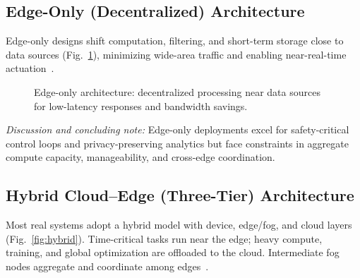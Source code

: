 \documentclass[conference]{IEEEtran}
\begin{document}
\subsection{Edge-Only (Decentralized) Architecture}
Edge-only designs shift computation, filtering, and short-term storage close to data sources (Fig.~\ref{fig:edgeonly}), minimizing wide-area traffic and enabling near-real-time actuation~\cite{Shi2016IoTJ,Satya2017Emergence}.

\begin{figure}[t]
  \centering
  \caption{Edge-only architecture: decentralized processing near data sources for low-latency responses and bandwidth savings.}
  \label{fig:edgeonly}
\end{figure}

\textit{Discussion and concluding note:} Edge-only deployments excel for safety-critical control loops and privacy-preserving analytics but face constraints in aggregate compute capacity, manageability, and cross-edge coordination.

\subsection{Hybrid Cloud--Edge (Three-Tier) Architecture}
Most real systems adopt a hybrid model with device, edge/fog, and cloud layers (Fig.~\ref{fig:hybrid}). Time-critical tasks run near the edge; heavy compute, training, and global optimization are offloaded to the cloud. Intermediate fog nodes aggregate and coordinate among edges~\cite{Chiang2016FogIoT,ETSI2016MEC}.
\end{document}
